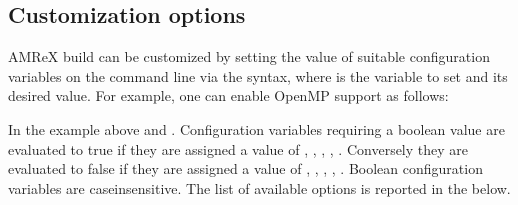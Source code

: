 \documentclass[letterpaper,10pt,english]{sphinxmanual}
\begin{document}
\subsection{Customization options}
\label{\detokenize{BuildingAMReX:customization-options}}\label{\detokenize{BuildingAMReX:sec-build-cmake-options}}
\sphinxAtStartPar
AMReX build can be customized  by setting the value of suitable configuration variables
on the command line via the  syntax, where  is the
variable to set and  its desired value.
For example, one can enable OpenMP support as follows:

\begin{sphinxVerbatim}[commandchars=\\\{\}]
\end{sphinxVerbatim}

\sphinxAtStartPar
In the example above  and .
Configuration variables requiring a boolean value are evaluated to true if they
are assigned a value of , , , , . Conversely they are evaluated to false
if they are assigned a value of , , , , .
Boolean configuration variables are case\sphinxhyphen{}insensitive.
The list of available options is reported in the {\hyperref[\detokenize{BuildingAMReX:tab-cmakevar}]{}} below.
\end{document}

